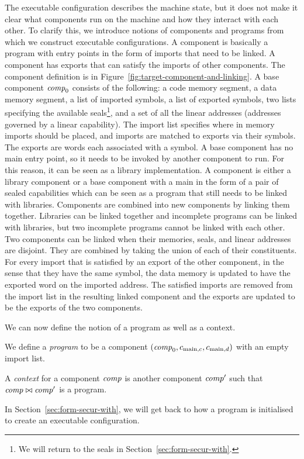 \documentclass[acmsmall,review,showframe]{acmart}\settopmatter{printfolios=true,printccs=false,printacmref=false}
\renewcommand{\comp}{\var{comp}}
\begin{document}
The executable configuration describes the machine state, but it does not make it clear what components run on the machine and how they interact with each other.
To clarify this, we introduce notions of components and programs from which we construct executable configurations.
A component is basically a program with entry points in the form of imports that need to be linked.
A component has exports that can satisfy the imports of other components.
The component definition is in Figure~\ref{fig:target-component-and-linking}.
A base component $\comp_0$ consists of the following: a code memory segment, a data memory segment, a list of imported symbols, a list of exported symbols, two lists specifying the available seals\footnote{We will return to the seals in Section~\ref{sec:form-secur-with}.}, and a set of all the linear addresses (addresses governed by a linear capability).
The import list specifies where in memory imports should be placed, and imports are matched to exports via their symbols.
The exports are words each associated with a symbol.
A base component has no main entry point, so it needs to be invoked by another component to run. For this reason, it can be seen as a library implementation.
A component is either a library component or a base component with a main in the form of a pair of sealed capabilities which can be seen as a program that still needs to be linked with libraries.
Components are combined into new components by linking them together.
Libraries can be linked together and incomplete programs can be linked with libraries, but two incomplete programs cannot be linked with each other.
Two components can be linked when their memories, seals, and linear addresses are disjoint.
They are combined by taking the union of each of their constituents.
For every import that is satisfied by an export of the other component, in the sense that they have the same symbol, the data memory is updated to have the exported word on the imported address.
The satisfied imports are removed from the import list in the resulting linked component and the exports are updated to be the exports of the two components.

We can now define the notion of a program as well as a context.
\begin{definition}
  \label{def:program-and-context}
  We define a \emph{program} to be a component $(\comp_0,c_{\mathrm{main},c}, c_{\mathrm{main},d})$ with an empty import list.

  A \emph{context} for a component $\comp$ is another component $\comp'$ such that $\comp \bowtie \comp'$ is a program.
\end{definition}
In Section~\ref{sec:form-secur-with}, we will get back to how a program is initialised to create an executable configuration.
\end{document}
